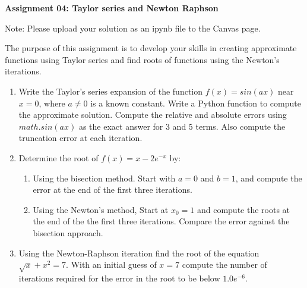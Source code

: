 \documentclass[a4paper,12pt]{article}
\begin{document}
\begin{centering}
	\textbf{
		Assignment 04: Taylor series and Newton Raphson
	}
\end{centering}


Note: Please upload your solution as an ipynb file to the Canvas page.

\vspace{1em}
 
 The purpose of this assignment is to develop your skills in creating approximate functions using Taylor series and find roots of functions using the Newton's iterations.
 
\begin{enumerate}
	\item Write the Taylor's series expansion of the function $f(x)
	= sin(ax)$ 
	near $x = 0$,
	where $a \ne 0$ is a known constant. Write a Python function to compute the approximate solution. Compute the relative and absolute errors using $math.sin(ax)$ as the exact answer for 3 and 5 terms. Also compute the truncation error at each iteration.
	
	
	\item Determine the root of $f(x) = x - 2e^{-x}$ by:
	\begin{enumerate}
		\item Using the bisection method. Start with $a = 0$ and $b = 1$, and compute the error at the end of the first three iterations.
		\item Using the Newton's method, Start at $x_0 = 1$ and compute the roots at the end of the the first three iterations. Compare the error against the bisection approach.
	\end{enumerate}

	\item Using the Newton-Raphson iteration find the root of the equation $\sqrt{x} + x^2 = 7$. With an initial guess of $x = 7$ compute the number of iterations required for the error in the root to be below $1.0e^{-6}$.
\end{enumerate}
\end{document}
